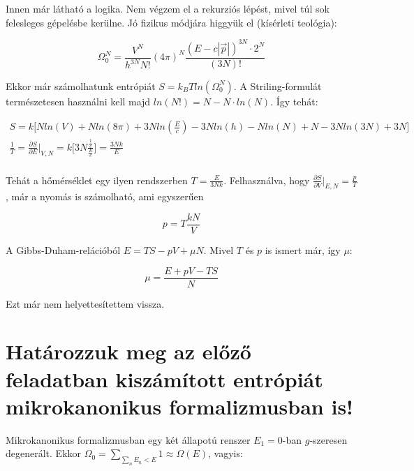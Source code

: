 \documentclass[a4paper,12pt]{article}
\begin{document}
\par Innen már látható a logika. Nem végzem el a rekurziós lépést, mivel túl sok felesleges gépelésbe kerülne. Jó fizikus módjára higgyük el (kísérleti teológia):

\begin{equation}
\Omega_{0}^{N} = \frac{V^{N}}{h^{3N}N!}(4\pi)^{N}\frac{(E - c|\vec{p}|)^{3N}\cdot 2^{N}}{(3N)!}
\end{equation}

\par Ekkor már számolhatunk entrópiát $S = k_{B}Tln(\Omega_{0}^{N})$. A Striling-formulát természetesen használni kell majd $ln(N!) = N - N\cdot ln(N)$. Így tehát:

\begin{equation*}
\begin{gathered}
S = k\Big[Nln(V) + Nln(8\pi) + 3Nln(\frac{E}{c}) - 3Nln(h) - Nln(N) + N - 3Nln(3N) + 3N\Big] \\
\frac{1}{T} = \frac{\partial S}{\partial E}\Big|_{V,N} = k\Big[3N\frac{\frac{1}{c}}{\frac{E}{c}}\Big] = \frac{3Nk}{E} \\
\end{gathered}
\end{equation*}

\par Tehát a hőmérséklet egy ilyen rendszerben $T = \frac{E}{3Nk}$. Felhasználva, hogy $\frac{\partial S}{\partial V}\Big|_{E,N} = \frac{p}{T}$, már a nyomás is számolható, ami egyszerűen

\begin{equation*}
p = T\frac{kN}{V}
\end{equation*}

\par A Gibbs-Duham-relációból $E = TS - pV + \mu N$. Mivel $T$ és $p$ is ismert már, így $\mu$:

\begin{equation*}
\mu = \frac{E + pV - TS}{N}
\end{equation*}

\par Ezt már nem helyettesítettem vissza.

\section{Határozzuk meg az előző feladatban kiszámított entrópiát mikrokanonikus formalizmusban is!}

\par Mikrokanonikus formalizmusban egy két állapotú renszer $E_{1} = 0$-ban $g$-szeresen degenerált. Ekkor $\Omega_{0} = \sum_{\sum_{n}E_{n} < E}1 \approx \Omega(E)$, vagyis:
\end{document}
